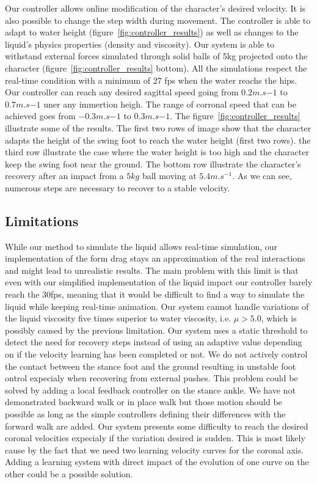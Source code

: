 \documentclass[conference]{acmsiggraph}
\begin{document}
Our controller allows online modification of the character's desired velocity. It is also possible to change the step width during movement. The controller is able to adapt to water height (figure~\ref{fig:controller_results}) as well as changes to the liquid's physics properties (density and viscosity). Our system is able to withstand external forces simulated through solid balls of 5kg projected onto the character (figure~\ref{fig:controller_results} bottom). All the simulations respect the real-time condition with a minimum of 27 fps when the water reachs the hips.
Our controller can reach any desired sagittal speed going from $0.2m.s{-1}$ to $0.7m.s{-1}$ uner any immertion heigh. The range of corronal speed that can be achieved goes from $-0.3m.s{-1}$ to $0.3m.s{-1}$.
The figure~\ref{fig:controller_results} illustrate some of the results. The first two rows of image show that the character adapts the height of the swing foot to reach the water height (first two rows). the third row illustrate the case where the water height is too high and the character keep the swing foot near the ground. The bottom row illustrate the character's recovery after an impact from a $5kg$ ball moving at $5.4m.s^{-1}$. As we can see, numerous steps are necessary to recover to a stable velocity.

\subsection{Limitations}

While our method to simulate the liquid allows real-time simulation, our implementation of the form drag stays an approximation of the real interactions and might lead to unrealistic results. The main problem with this limit is that even with our simplified implementation of the liquid impact our controller barely reach the 30fps, meaning that it would be difficult to find a way to simulate the liquid while keeping real-time animation. Our system cannot handle variations of the liquid viscosity five times superior to water viscosity, i.e. $\mu>5.0$, which is possibly caused by the previous limitation. Our system uses a static threshold to detect the need for recovery steps instead of using an adaptive value depending on if the velocity learning has been completed or not. We do not actively control the contact between the stance foot and the ground resulting in unstable foot ontrol expecialy when recovering from external pushes. This problem could be solved by adding a local feedback controller on the stance ankle. We have not demonstrated backward walk or in place walk but those motion should be possible as long as the simple controllers defining their differences with the forward walk are added. Our system presents some difficulty to reach the desired coronal velocities expecialy if the variation desired is sudden. This is most likely cause by the fact that we need two learning velocity curves for the coronal axis. Adding a learning system with direct impact of the evolution of one curve on the other could be a possible solution.
\end{document}
